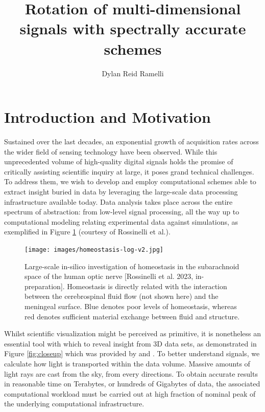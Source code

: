 \documentclass[]{usiinfbachelorproject}
\title{Rotation of multi-dimensional signals with spectrally accurate schemes}
\author{Dylan Reid Ramelli}
\begin{document}
		
	\maketitle
	
	\tableofcontents
	\newpage
	\section{Introduction and Motivation}\label{introduction}
	Sustained over the last decades, an exponential growth of acquisition rates across the wider field of sensing technology have been observed. While this unprecedented volume of high-quality digital signals holds the promise of critically assisting scientific inquiry at large, it poses grand technical challenges. To address them, we wish to develop and employ computational schemes able to extract insight buried in data by leveraging the large-scale data processing infrastructure available today. Data analysis takes place across the entire spectrum of abstraction: from low-level signal processing, all the way up to computational modeling relating experimental data against simulations, as exemplified in Figure \ref{fig:optical_nerve_3D} (courtesy of Rossinelli et al.\cite{high_quality_1}).
	
	
	\begin{figure}
		\centering
		\texttt{[image: images/homeostasis-log-v2.jpg]}
		\caption{Large-scale in-silico investigation of homeostasis in the subarachnoid space of the human optic nerve [Rossinelli et al. 2023, in-preparation]. Homeostasis is directly related with the interaction between the cerebrospinal fluid flow (not shown here) and the meningeal surface. Blue denotes poor levels of homeostasis, whereas red denotes sufficient material exchange between fluid and structure.}
		\label{fig:optical_nerve_3D}
	\end{figure}
	
	Whilst scientific visualization might be perceived as primitive, it is nonetheless an essential tool with which to reveal insight from 3D data sets, as demonstrated in Figure \ref{fig:closeup} which was provided by \cite{high_quality_2} and \cite{slice}. To better understand signals, we calculate how light is transported within the data volume. Massive amounts of light rays are cast from the sky, from every directions. To obtain accurate results in reasonable time on Terabytes, or hundreds of Gigabytes of data, the associated computational workload must be carried out at high fraction of nominal peak of the underlying computational infrastructure.
	
\end{document}
